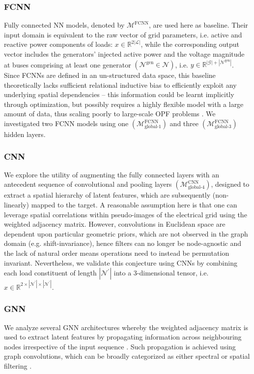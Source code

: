 \documentclass[journal]{IEEEtran}
\newcommand{\Node}{\mathcal{N}}
\newcommand{\Load}{\mathcal{L}}
\newcommand{\Generator}{\mathcal{G}}
\begin{document}
\subsubsection{FCNN}
Fully connected NN models, denoted by $\mathcal{M}^{\mathrm{FCNN}}$, are used here as baseline. Their input domain is equivalent to the raw vector of grid parameters, i.e. active and reactive power components of loads: $x \in \mathbb{R}^{2 |\Load|}$, while the corresponding output vector includes the generators' injected active power and the voltage magnitude at buses comprising at least one generator $(\Node^\textrm{gen} \in \Node)$, i.e. $y \in \mathbb{R}^{|\Generator| + |\Node^\textrm{gen}|}$. Since FCNNs are defined in an un-structured data space, this baseline theoretically lacks sufficient relational inductive bias to efficiently exploit any underlying spatial dependencies -- this information could be learnt implicitly through optimization, but possibly requires a highly flexible model with a large amount of data, thus scaling poorly to large-scale OPF problems \cite{Dehmamy2019}. We investigated two FCNN models using one $(\mathcal{M}^{\textrm{FCNN}}_{\textrm{global-1}})$ and three $(\mathcal{M}^{\textrm{FCNN}}_{\textrm{global-3}})$ hidden layers.

\subsubsection{CNN}
We explore the utility of augmenting the fully connected layers with an antecedent sequence of convolutional and pooling layers $(\mathcal{M}^{\textrm{CNN}}_{\textrm{global-4}})$, designed to extract a spatial hierarchy of latent features, which are subsequently (non-linearly) mapped to the target. A reasonable assumption here is that one can leverage spatial correlations within pseudo-images of the electrical grid using the weighted adjacency matrix. However, convolutions in Euclidean space are dependent upon particular geometric priors, which are not observed in the graph domain (e.g. shift-invariance), hence filters can no longer be node-agnostic and the lack of natural order means operations need to instead be permutation invariant. Nevertheless, we validate this conjecture using CNNs by combining each load constituent of length $|\Node^\prime|$ into a 3-dimensional tensor, i.e. $x \in \mathbb{R}^{2 \times |\Node^\prime| \times |\Node^\prime|}$.

\subsubsection{GNN}
We analyze several GNN architectures whereby the weighted adjacency matrix is used to extract latent features by propagating information across neighbouring nodes irrespective of the input sequence \cite{Zhou2018}. Such propagation is achieved using graph convolutions, which can be broadly categorized as either spectral or spatial filtering \cite{Zonghan2021}.
\end{document}
